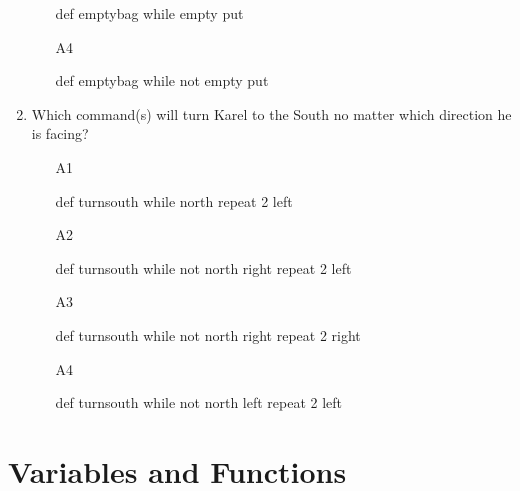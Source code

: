 \begin{enumerate}
\begin{enumerate}
\begin{bluecode}
def emptybag
    while empty
        put
\end{bluecode}
\item[A4] 
\begin{bluecode}
def emptybag
    while not empty
        put
\end{bluecode}
\end{enumerate}
\item Which command(s) will turn Karel to the South no matter 
      which direction he is facing?
\begin{enumerate}
\item[A1] 
\begin{bluecode}
def turnsouth
    while north
        repeat 2
            left
\end{bluecode}
\item[A2] 
\begin{bluecode}
def turnsouth
    while not north
        right
    repeat 2
        left
\end{bluecode}
\item[A3] 
\begin{bluecode}
def turnsouth
    while not north
        right
    repeat 2
        right
\end{bluecode}
\item[A4] 
\begin{bluecode}
def turnsouth
    while not north
        left
    repeat 2
        left
\end{bluecode}
\end{enumerate}
\end{enumerate}



\section{Variables and Functions}

